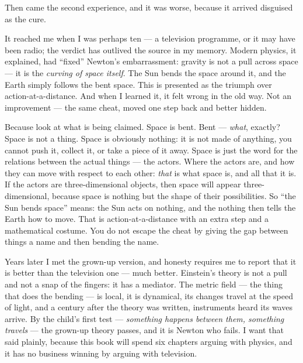 \documentclass[fontsize=11pt,paper=a4,pagesize=auto,parskip=half-]{scrbook}
\newcommand{\Iy}[1]{#1\index{#1}}
\begin{document}
Then came the second experience, and it was worse, because it arrived disguised as the cure.

It reached me when I was perhaps ten --- a television programme, or it may have been radio; the verdict has outlived the source in my memory. Modern physics, it explained, had ``fixed'' Newton's embarrassment: gravity is not a pull across space --- it is the \emph{curving of space itself}. The Sun bends the space around it, and the Earth simply follows the bent space. This is presented as the triumph over action-at-a-distance. And when I learned it, it felt wrong in the old way. Not an improvement --- the same cheat, moved one step back and better hidden.

Because look at what is being claimed. Space is bent. Bent --- \emph{what}, exactly? Space is not a thing. Space is obviously nothing: it is not made of anything, you cannot push it, collect it, or take a piece of it away. Space is just the word for the relations between the actual things --- the actors. Where the actors are, and how they can move with respect to each other: \emph{that} is what space is, and all that it is. If the actors are three-dimensional objects, then space will appear three-dimensional, because space is nothing but the shape of their possibilities. So ``the Sun bends space'' means: the Sun acts on nothing, and the nothing then tells the Earth how to move. That is action-at-a-distance with an extra step and a mathematical costume. You do not escape the cheat by giving the gap between things a name and then bending the name.

Years later I met the grown-up version, and honesty requires me to report that it is better than the television one --- much better. \Iy{Einstein}'s theory is not a pull and not a snap of the fingers: it has a mediator. The metric field --- the thing that does the bending --- is local, it is dynamical, its changes travel at the speed of light, and a century after the theory was written, instruments heard its waves arrive. By the child's first test --- \emph{something happens between them, something travels} --- the grown-up theory passes, and it is Newton who fails. I want that said plainly, because this book will spend six chapters arguing with physics, and it has no business winning by arguing with television.
\end{document}
